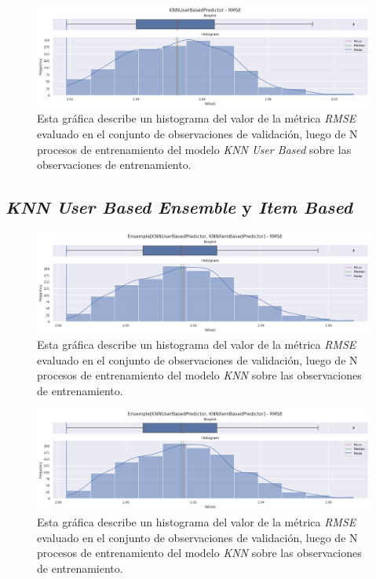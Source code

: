 \documentclass[11pt,a4paper,twoside]{thesis}
\begin{document}
{\begin{figure}[!htb]
	\centering
	\includegraphics[width=15cm]{./images/metrics-knn-user-based-RMSE.png}
	\caption{Esta gráfica describe un histograma del valor de la métrica \textit{RMSE} evaluado en el conjunto de observaciones de validación, luego de N procesos de entrenamiento del modelo \textit{KNN User Based} sobre las observaciones de entrenamiento.}
\end{figure}



\clearpage

\subsection{\textit{KNN User Based Ensemble} y \textit{Item Based}}

\begin{figure}[!htb]
	\centering
	\includegraphics[width=15cm]{./images/metrics-knn-ensemple-RMSE.png}
	\caption{Esta gráfica describe un histograma del valor de la métrica \textit{RMSE} evaluado en el conjunto de observaciones de validación, luego de N procesos de entrenamiento del modelo \textit{KNN} sobre las observaciones de entrenamiento.}
\end{figure}

\begin{figure}[!htb]
	\centering
	\includegraphics[width=15cm]{./images/metrics-knn-ensemple-RMSE.png}
	\caption{Esta gráfica describe un histograma del valor de la métrica \textit{RMSE} evaluado en el conjunto de observaciones de validación, luego de N procesos de entrenamiento del modelo \textit{KNN} sobre las observaciones de entrenamiento.}
\end{figure}


}
\end{document}
